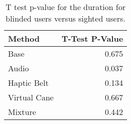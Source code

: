 
\begin{table}[!htb]
\centering
\caption{T test p-value for the duration for blinded users versus sighted users.}
\label{tab:ttest_duration}
\begin{tabular}{lr}
\toprule
      Method &  T-Test P-Value \\
\midrule
        Base &           0.675 \\
       Audio &           0.037 \\
 Haptic Belt &           0.134 \\
Virtual Cane &           0.667 \\
     Mixture &           0.442 \\
\bottomrule
\end{tabular}
\end{table}


